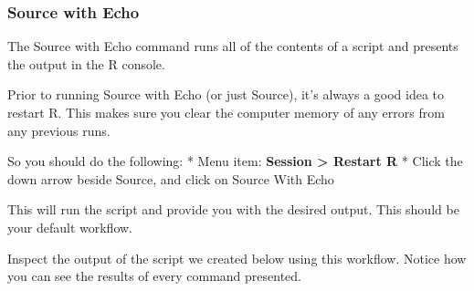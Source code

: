 \documentclass[
]{krantz}
\begin{document}
\hypertarget{source-with-echo}{%
\subsubsection{Source with Echo}\label{source-with-echo}}

The Source with Echo command runs all of the contents of a script and presents the output in the R console.

Prior to running Source with Echo (or just Source), it's always a good idea to restart R. This makes sure you clear the computer memory of any errors from any previous runs.

So you should do the following:
* Menu item: \textbf{Session \textgreater{} Restart R}
* Click the down arrow beside Source, and click on Source With Echo

This will run the script and provide you with the desired output. This should be your default workflow.

Inspect the output of the script we created below using this workflow. Notice how you can see the results of every command presented.
\end{document}
